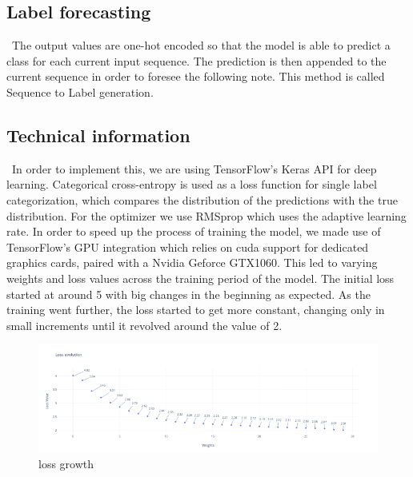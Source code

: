 \documentclass[12pt]{article}
\begin{document}
\subsection*{Label forecasting}
\begin{flushright}
  \begin{minipage}[t]{0.96\linewidth}\
    The output values are one-hot encoded so that the model is able to predict a class for each current input sequence. The prediction is then appended to the current sequence in order to foresee the following note. This method is called Sequence to Label generation.
  \end{minipage}
\end{flushright}
\subsection*{Technical information}
\begin{flushright}
  \begin{minipage}[t]{0.96\linewidth}\
    In order to implement this, we are using TensorFlow’s Keras API for deep learning. Categorical cross-entropy is used as a loss function for single label categorization, which compares the distribution of the predictions with the true distribution. For the optimizer we use RMSprop which uses the adaptive learning rate.
    In order to speed up the process of training the model, we made use of TensorFlow’s GPU integration which relies on cuda support for dedicated graphics cards, paired with a Nvidia Geforce GTX1060. This led to varying weights and loss values across the training period of the model. The initial loss started at around 5 with big changes in the beginning as expected. As the training went further, the loss started to get more constant, changing only in small increments until it revolved around the value of 2.
  \end{minipage}
\end{flushright}
\begin{figure}
  \centering
  \includegraphics[width=\linewidth]{../images/loss_evolution.png}
  \caption{loss growth}
  \label{Figure 1}
\end{figure}
\end{document}
